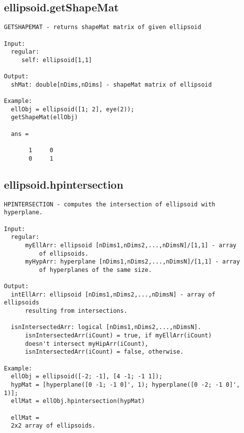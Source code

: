 \subsection{\texorpdfstring{ellipsoid.getShapeMat}{getShapeMat}}\label{method:ellipsoid.getShapeMat}
\begin{verbatim}
GETSHAPEMAT - returns shapeMat matrix of given ellipsoid

Input:
  regular:
     self: ellipsoid[1,1]

Output:
  shMat: double[nDims,nDims] - shapeMat matrix of ellipsoid

Example:
  ellObj = ellipsoid([1; 2], eye(2));
  getShapeMat(ellObj)

  ans =

       1     0
       0     1
\end{verbatim}
\subsection{\texorpdfstring{ellipsoid.hpintersection}{hpintersection}}\label{method:ellipsoid.hpintersection}
\begin{verbatim}
HPINTERSECTION - computes the intersection of ellipsoid with hyperplane.

Input:
  regular:
      myEllArr: ellipsoid [nDims1,nDims2,...,nDimsN]/[1,1] - array
          of ellipsoids.
      myHypArr: hyperplane [nDims1,nDims2,...,nDimsN]/[1,1] - array
          of hyperplanes of the same size.

Output:
  intEllArr: ellipsoid [nDims1,nDims2,...,nDimsN] - array of ellipsoids
      resulting from intersections.

  isnIntersectedArr: logical [nDims1,nDims2,...,nDimsN].
      isnIntersectedArr(iCount) = true, if myEllArr(iCount)
      doesn't intersect myHipArr(iCount),
      isnIntersectedArr(iCount) = false, otherwise.

Example:
  ellObj = ellipsoid([-2; -1], [4 -1; -1 1]);
  hypMat = [hyperplane([0 -1; -1 0]', 1); hyperplane([0 -2; -1 0]', 1)];
  ellMat = ellObj.hpintersection(hypMat)

  ellMat =
  2x2 array of ellipsoids.
\end{verbatim}

